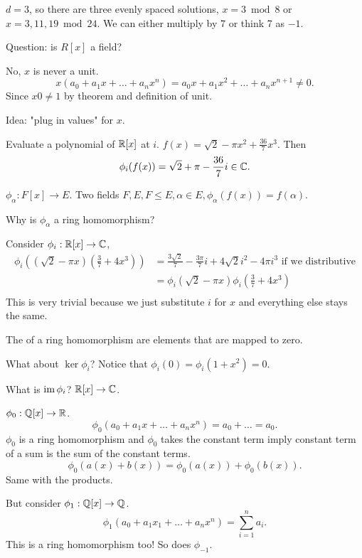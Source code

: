 \documentclass[class=article,crop=false]{standalone}
\begin{document}
\begin{note}[hw20.10]
$ d=3$, so there are three evenly spaced solutions,  $ x=3 \bmod 8$ or $ x=3,11,19 \bmod 24$. We can either multiply by 7 or think 7 as  $ -1$.
\end{note}

Question: is $ R[x]$ a field?

No,  $ x$ is never a unit.
 \[
	 x(a_0+a_1 x + \ldots + a_n x^{n}) = a_0 x +a_1 x^2 + \ldots + a_n x^{n+1} \neq 0
.\] 
Since $ x0\neq 1$ by theorem and definition of unit.

\begin{eg}

Idea: "plug in values" for $ x$.  

Evaluate a polynomial of $ \mathbb{R}[x]$ at $ i$.  $ f(x) = \sqrt{2} -\pi x^2 + \frac{36}{7} x^3 $. Then
\[
	\phi_{i}(f(x)) = \sqrt{2} + \pi - \frac{36}{7} i \in \mathbb{C}  
.\]

$ \phi_\alpha: F[x] \to E$. Two fields $ F,E, F \leq E, \alpha \in E, \phi_{\alpha} (f(x)) = f(\alpha)$.  

Why is $ \phi_{\alpha}$ a ring homomorphism?

Consider $ \phi_i : \mathbb{R}[x] \to \mathbb{C}$, 
\begin{align*}
	\phi_i( (\sqrt{2} - \pi x  )(\frac{3}{7}+4x^3)) &= \frac{3\sqrt{2} }{7 } - \frac{3\pi}{7 }i + 4\sqrt{2} i^2 - 4\pi i ^3 \text{ if we distributive}  \\
							&= \phi_i(\sqrt{2}-\pi x ) \phi_i (\frac{3}{7}+4x^3) \\
\end{align*}
This is very trivial because we just substitute $ i$ for  $ x$ and everything else stays the same.
\end{eg}

\begin{defn}
The  of a ring homomorphism are elements that are mapped to zero. 
\end{defn}

What about $ \ker \phi_i$? Notice that $ \phi_i(0)=\phi_i(1+x^2) = 0$.

What is $ \operatorname{im} \phi_i$? $ \mathbb{R}[x] \to \mathbb{C}$.

\begin{eg}[22.6]
	$ \phi_0 : \mathbb{Q}[x] \to \mathbb{R}$.
	\[
		\phi_0 (a_0+a_1x+\ldots+a_n x^{n}) = a_0 + \ldots = a_0
	.\] 
	$ \phi_0$ is a ring homomorphism and $ \phi_0$ takes the constant term imply constant term of a sum is the sum of the constant terms.
	\[
		\phi_0(a(x)+b(x)) = \phi_0(a(x))+\phi_0(b(x))
	.\] 
	Same with the products.

	But consider $ \phi_1: \mathbb{Q}[x] \to \mathbb{Q}$.
	\[
		\phi_1(a_0+a_1x_1+ \ldots + a_n x^{n}) = \sum_{ i= 1}^{ n} a_i
	.\]
	This is a ring homomorphism too! So does $ \phi_{-1}$.
\end{eg}
\end{document}
